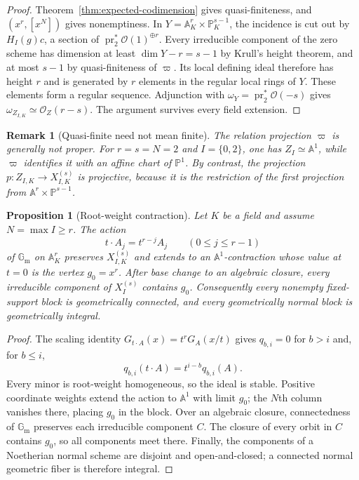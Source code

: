 \documentclass[10pt,fleqn]{article}
\numberwithin{equation}{section}
\newtheorem{proposition}[theorem]{Proposition}
\newtheorem{remark}[theorem]{Remark}
\newcommand{\A}{\mathbb A}
\newcommand{\PP}{\mathbb P}
\newcommand{\Gm}{\mathbb G_{\mathrm m}}
\begin{document}
\begin{proof}
Theorem~\ref{thm:expected-codimension} gives quasi-finiteness, and
$(x^r,[x^N])$ gives nonemptiness.  In $Y=\A_K^r\times\PP_K^{s-1}$,
the incidence is cut out by $H_I(g)c$, a section of
$\operatorname{pr}_2^*\mathcal O(1)^{\oplus r}$.
Every irreducible component of the zero scheme has dimension at
least $\dim Y-r=s-1$ by Krull's height theorem, and at most $s-1$
by quasi-finiteness of $\varpi$.  Its local defining ideal therefore
has height $r$ and is generated by $r$ elements in the regular
local rings of $Y$.  These elements form a regular sequence.
Adjunction with $\omega_Y=\operatorname{pr}_2^*\mathcal O(-s)$
gives $\omega_{Z_{I,K}}\simeq\mathcal O_Z(r-s)$.
The argument survives every field extension.
\end{proof}

\begin{remark}[Quasi-finite need not mean finite]
\label{rem:relation-projection-not-finite}
The relation projection $\varpi$ is generally not proper.  For
$r=s=N=2$ and $I=\{0,2\}$, one has $Z_I\simeq\A^1$, while $\varpi$ identifies it with an
affine chart of $\PP^1$.  By contrast, the projection
$p:Z_{I,K}\to X_{I,K}^{(s)}$ is projective, because it is the restriction of the first
projection from $\A^r\times\PP^{s-1}$.
\end{remark}

\begin{proposition}[Root-weight contraction]
\label{prop:root-weight-contraction}
Let $K$ be a field and assume $N=\max I\ge r$.  The action
\begin{equation}\label{eq:root-weight-contraction-action}
 t\cdot A_j=t^{r-j}A_j\qquad(0\le j\le r-1)
\end{equation}
of $\Gm$ on $\A_K^r$ preserves $X_{I,K}^{(s)}$ and extends to an $\A^1$-contraction whose
value at $t=0$ is the vertex $g_0=x^r$.  After base change to an algebraic closure, every
irreducible component of $X_I^{(s)}$ contains $g_0$.  Consequently every nonempty
fixed-support block is geometrically connected, and every geometrically normal block is
geometrically integral.
\end{proposition}

\begin{proof}
The scaling identity $G_{t\cdot A}(x)=t^rG_A(x/t)$ gives $q_{b,i}=0$ for $b>i$ and, for
$b\le i$,
\begin{equation}\label{eq:root-weight-remainder-scaling}
 q_{b,i}(t\cdot A)=t^{i-b}q_{b,i}(A).
\end{equation}
Every minor is root-weight homogeneous, so the ideal is stable.
Positive coordinate weights extend the action to $\A^1$ with limit
$g_0$; the $N$th column vanishes there, placing $g_0$ in the block.
Over an algebraic closure, connectedness of $\Gm$ preserves each
irreducible component $C$.  The closure of every orbit in $C$ contains
$g_0$, so all components meet there.  Finally, the components of a
Noetherian normal scheme are disjoint and open-and-closed; a connected
normal geometric fiber is therefore integral.
\end{proof}
\end{document}
